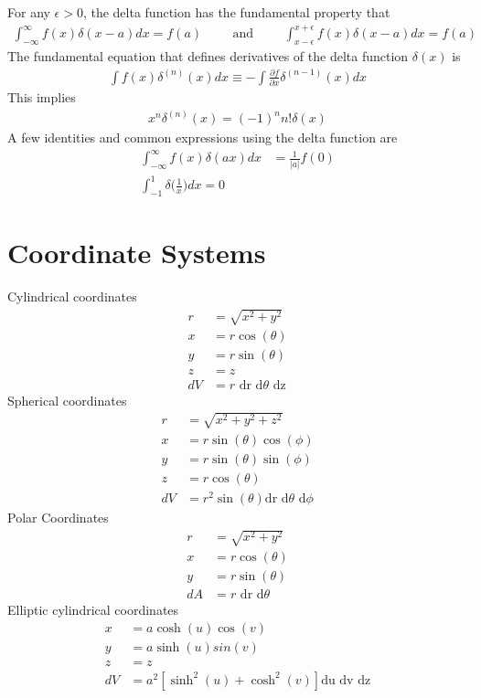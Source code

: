 For any $\epsilon > 0$, the delta function has the fundamental property that 
\begin{align}
	\int_{-\infty}^{\infty}f(x)\delta(x-a)dx = f(a) \hspace{1cm}\textrm{and}\hspace{1cm}\int_{x-\epsilon}^{x+\epsilon}f(x)\delta(x-a)dx = f(a)
\end{align}
The fundamental equation that defines derivatives of the delta function $\delta(x)$ is
\begin{align}
	\int f(x)\delta^{(n)}(x)dx \equiv -\int \frac{\partial f}{\partial x}\delta^{(n-1)}(x)dx
\end{align} 
This implies 
\begin{align}
	x^n\delta^{(n)}(x)=(-1)^nn!\delta(x)
\end{align}
A few identities and common expressions using the delta function are
\begin{align}
	\int_{-\infty}^{\infty}f(x)\delta(ax)dx &= \frac{1}{|a|}f(0) \\
	\int_{-1}^{1}\delta\bigg(\frac{1}{x}\bigg)dx = 0
\end{align}




\section{Coordinate Systems}
\begin{multicols}{2}
Cylindrical coordinates
\begin{align}
r&=\sqrt{x^2+y^2} \\
x&=r\cos(\theta) \\
y&=r\sin(\theta) \\
z&=z \\
dV&= r \textrm{ dr d$\theta$ dz}
\end{align}
Spherical coordinates
\begin{align}
r&=\sqrt{x^2+y^2+z^2} \\
x&=r\sin(\theta)\cos(\phi) \\
y&=r\sin(\theta)\sin(\phi) \\
z&=r\cos(\theta) \\
dV&=r^2\sin(\theta)\textrm{dr d$\theta$ d$\phi$}
\end{align}
Polar Coordinates
\begin{align}
	r&=\sqrt{x^2+y^2} \\
	x&=r\cos(\theta) \\
	y&=r\sin(\theta) \\
	dA&= r \textrm{ dr d$\theta$}
\end{align}
Elliptic cylindrical coordinates
\begin{align}
	x&= a \cosh(u) \cos(v) \\
	y&= a \sinh(u) sin(v) \\
	z&= z \\
	dV&=a^2[\sinh^2(u)+\cosh^2(v)]\textrm{du dv dz}
\end{align}
\end{multicols}




